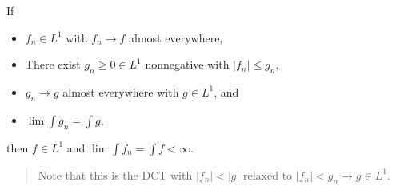 \begin{theorem}

If

\begin{itemize}
\tightlist
\item
  \(f_n \in L^1\) with \(f_n \to f\) almost everywhere,
\item
  There exist \(g_n\geq 0 \in L^1\) nonnegative with
  \({\left\lvert {f_n} \right\rvert} \leq g_n\),
\item
  \(g_n\to g\) almost everywhere with \(g\in L^1\), and
\item
  \(\lim \int g_n = \int g\),
\end{itemize}

then \(f\in L^1\) and \(\lim \int f_n = \int f < \infty\).

\begin{quote}
Note that this is the DCT with
\({\left\lvert {f_n} \right\rvert} < {\left\lvert {g} \right\rvert}\)
relaxed to \({\left\lvert {f_n} \right\rvert} < g_n \to g\in L^1\).
\end{quote}

\end{theorem}


